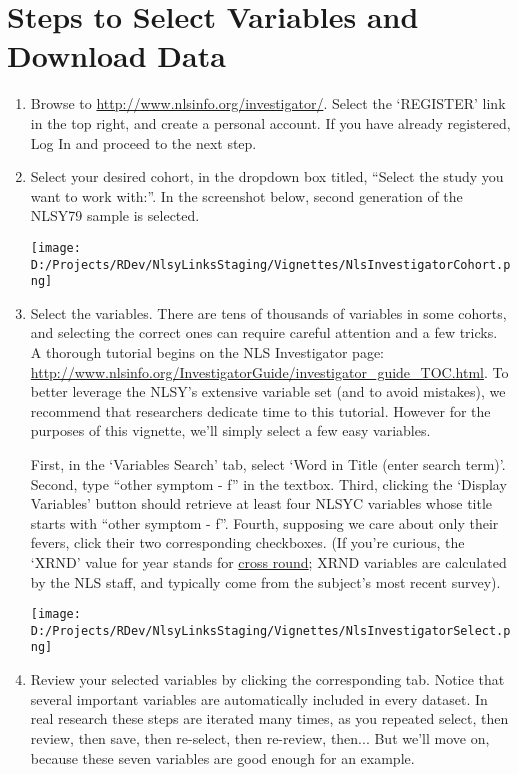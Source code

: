 \documentclass{article}\usepackage[]{graphicx}\usepackage[]{color}
\begin{document}
\section{Steps to Select Variables and Download Data}
\begin{enumerate}
\item Browse to \url{http://www.nlsinfo.org/investigator/}.  Select the `REGISTER' link in the top right, and create a personal account.  If you have already registered, Log In and proceed to the next step.
\item Select your desired cohort, in the dropdown box titled, ``Select the study you want to work with:''.  In the screenshot below, second generation of the NLSY79 sample is selected.

\texttt{[image: D:/Projects/RDev/NlsyLinksStaging/Vignettes/NlsInvestigatorCohort.png]}

\item Select the variables.  There are tens of thousands of variables in some cohorts, and selecting the correct ones can require careful attention and a few tricks.  A thorough tutorial begins on the NLS Investigator page: \url{http://www.nlsinfo.org/InvestigatorGuide/investigator_guide_TOC.html}.  To better leverage the NLSY's extensive variable set (and to avoid mistakes), we recommend that researchers dedicate time to this tutorial.  However for the purposes of this vignette, we'll simply select a few easy variables.  

First, in the `Variables Search' tab, select `Word in Title (enter search term)'.  Second, type ``other symptom - f'' in the textbox.  Third, clicking the `Display Variables' button should retrieve at least four NLSYC variables whose title starts with ``other symptom - f''.  Fourth, supposing we care about only their fevers, click their two corresponding checkboxes.  (If you're curious, the `XRND' value for year stands for \href{http://www.bls.gov/nls/nls138.pdf}{cross round}; XRND variables are calculated by the NLS staff, and typically come from the subject's most recent survey).

\texttt{[image: D:/Projects/RDev/NlsyLinksStaging/Vignettes/NlsInvestigatorSelect.png]}

\item Review your selected variables by clicking the corresponding tab.  Notice that several important variables are automatically included in every  dataset.  In real research these steps are iterated many times, as you repeated select, then review, then save, then re-select, then re-review, then...  But we'll move on, because these seven variables are good enough for an example.


\end{enumerate}
\end{document}
